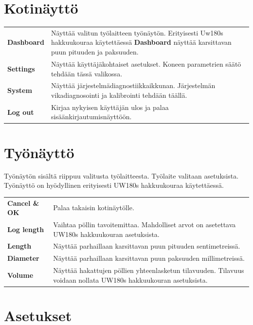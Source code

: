 \documentclass[12pt,a4paper,finnish]{uvmanual}
\begin{document}
\chapter{Kotinäyttö}\label{ch:home}


\begin{tabular}{ L{0.2\textwidth} L{0.66\textwidth} }
\textbf{Dashboard} & Näyttää valitun työlaitteen työnäytön. Erityisesti Uw180s hakkuukouraa käytettäessä \textbf{Dashboard} näyttää karsittavan puun pituuden ja paksuuden. \\
\textbf{Settings} & Näyttää käyttäjäkohtaiset asetukset. Koneen parametrien säätö tehdään tässä valikossa. \\
\textbf{System} & Näyttää järjestelmädiagnostiikkaikkunan. Järjestelmän vikadiagnosointi ja kalibrointi tehdään täällä. \\
\textbf{Log out} & Kirjaa nykyisen käyttäjän ulos ja palaa sisäänkirjautumisnäyttöön. \\
\end{tabular}



\chapter{Työnäyttö}\label{ch:dashboard}

Työnäytön sisältä riippuu valitusta työlaitteesta. Työlaite valitaan asetuksista. Työnäyttö on hyödyllinen erityisesti UW180s hakkuukouraa käytettäessä.


\begin{tabular}{ L{0.2\textwidth} L{0.66\textwidth} }
\textbf{Cancel \& OK} & Palaa takaisin kotinäytölle. \\
\textbf{Log length} & Vaihtaa pöllin tavoitemittaa. Mahdolliset arvot on asetettava UW180s hakkuukouran asetuksista.\\
\textbf{Length} & Näyttää parhaillaan karsittavan puun pituuden sentimetreissä. \\
\textbf{Diameter} & Näyttää parhaillaan karsittavan puun paksuuden millimetreissä. \\
\textbf{Volume} & Näyttää hakattujen pöllien yhteenlasketun tilavuuden. Tilavuus voidaan nollata UW180s hakkuukouran asetuksista. \\
\end{tabular}


\chapter{Asetukset}\label{ch:settings}
\end{document}
